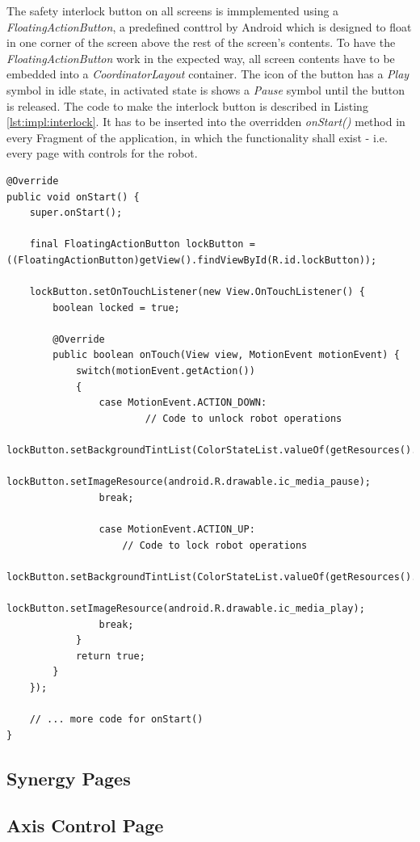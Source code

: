 The safety interlock button on all screens is immplemented using a \textit{FloatingActionButton}, a predefined conttrol by Android which is designed to float in one corner of the screen above the rest of the screen's contents. To have the \textit{FloatingActionButton} work in the expected way, all screen contents have to be embedded into a \textit{CoordinatorLayout} container. The icon of the button has a \textit{Play} symbol in idle state, in activated state is shows a \textit{Pause} symbol until the button is released. The code to make the interlock button is described in Listing \ref{lst:impl:interlock}. It has to be inserted into the overridden \textit{onStart()} method in every Fragment of the application, in which the functionality shall exist - i.e. every page with controls for the robot.

\begin{lstlisting}[caption={Code for the interlock button}, label=lst:impl:interlock]
@Override
public void onStart() {
	super.onStart();
	
	final FloatingActionButton lockButton = ((FloatingActionButton)getView().findViewById(R.id.lockButton));

	lockButton.setOnTouchListener(new View.OnTouchListener() {
		boolean locked = true;
		
		@Override
		public boolean onTouch(View view, MotionEvent motionEvent) {
			switch(motionEvent.getAction())
			{
				case MotionEvent.ACTION_DOWN:
                        // Code to unlock robot operations
						lockButton.setBackgroundTintList(ColorStateList.valueOf(getResources().getColor(R.color.posOk)));
						lockButton.setImageResource(android.R.drawable.ic_media_pause);
				break;
				
				case MotionEvent.ACTION_UP:
					// Code to lock robot operations
					lockButton.setBackgroundTintList(ColorStateList.valueOf(getResources().getColor(R.color.posNOk)));
					lockButton.setImageResource(android.R.drawable.ic_media_play);
				break;
			}			
			return true;
		}
	});
	
	// ... more code for onStart()
}
\end{lstlisting}

\subsection{Synergy Pages}

\subsection{Axis Control Page}

